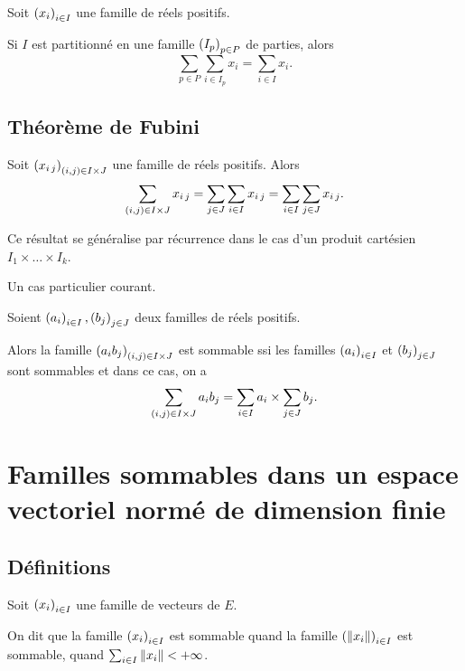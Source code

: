 \begin{theo}
Soit \(\left(x_i\right)_{i\in I}\) une famille de réels positifs.

Si \(I\) est partitionné en une famille \(\left(I_p\right)_{p\in P}\) de parties, alors \[\sum_{p\in P}\sum_{i\in I_p}x_i=\sum_{i\in I}x_i.\]
\end{theo}

\subsection{Théorème de Fubini}

\begin{theo}
Soit \(\left(x_{i\,j}\right)_{\left(i,j\right)\in I\times J}\) une famille de réels positifs. Alors \[\sum_{\left(i,j\right)\in I\times J}x_{i\,j}=\sum_{j\in J}\sum_{i\in I}x_{i\,j}=\sum_{i\in I}\sum_{j\in J}x_{i\,j}.\]
\end{theo}

Ce résultat se généralise par récurrence dans le cas d'un produit cartésien \(I_1\times\dots\times I_k\).

Un cas particulier courant.

\begin{prop}
Soient \(\left(a_i\right)_{i\in I},\left(b_j\right)_{j\in J}\) deux familles de réels positifs.

Alors la famille \(\left(a_ib_j\right)_{\left(i,j\right)\in I\times J}\) est sommable ssi les familles \(\left(a_i\right)_{i\in I}\) et \(\left(b_j\right)_{j\in J}\) sont sommables et dans ce cas, on a \[\sum_{\left(i,j\right)\in I\times J}a_ib_j=\sum_{i\in I}a_i\times\sum_{j\in J}b_j.\]
\end{prop}

\section{Familles sommables dans un espace vectoriel normé de dimension finie}

\subsection{Définitions}

\begin{defi}
Soit \(\left(x_i\right)_{i\in I}\) une famille de vecteurs de \(E\).

On dit que la famille \(\left(x_i\right)_{i\in I}\) est sommable quand la famille \(\paren{\norme{x_i}}_{i\in I}\) est sommable, \cad quand \(\sum_{i\in I}\norme{x_i}<\pinf\).
\end{defi}

